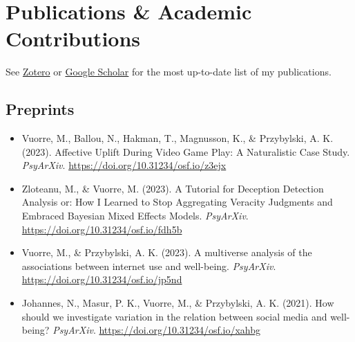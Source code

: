 \documentclass[12pt, a4paper]{article}
\begin{document}
\section*{Publications \& Academic Contributions}
See \href{https://www.zotero.org/vuorre}{Zotero} or \href{https://scholar.google.com/citations?hl=en&user=I4DSy-8AAAAJ&view_op=list_works&sortby=pubdate}{Google Scholar} for the most up-to-date list of my publications.

\subsection*{Preprints}
\begin{itemize}
  \item Vuorre, M., Ballou, N., Hakman, T., Magnusson, K., \& Przybylski, A. K. (2023). Affective Uplift During Video Game Play: A Naturalistic Case Study. \emph{PsyArXiv}. \url{https://doi.org/10.31234/osf.io/z3ejx}
  \item Zloteanu, M., \& Vuorre, M. (2023). A Tutorial for Deception Detection Analysis or: How I Learned to Stop Aggregating Veracity Judgments and Embraced Bayesian Mixed Effects Models. \emph{PsyArXiv}. \url{https://doi.org/10.31234/osf.io/fdh5b}
  \item Vuorre, M., \& Przybylski, A. K. (2023). A multiverse analysis of the associations between internet use and well-being. \emph{PsyArXiv}. \url{https://doi.org/10.31234/osf.io/jp5nd}
  \item Johannes, N., Masur, P. K., Vuorre, M., \& Przybylski, A. K. (2021). How should we investigate variation in the relation between social media and well-being? \emph{PsyArXiv}. \url{https://doi.org/10.31234/osf.io/xahbg}
\end{itemize}
\end{document}
